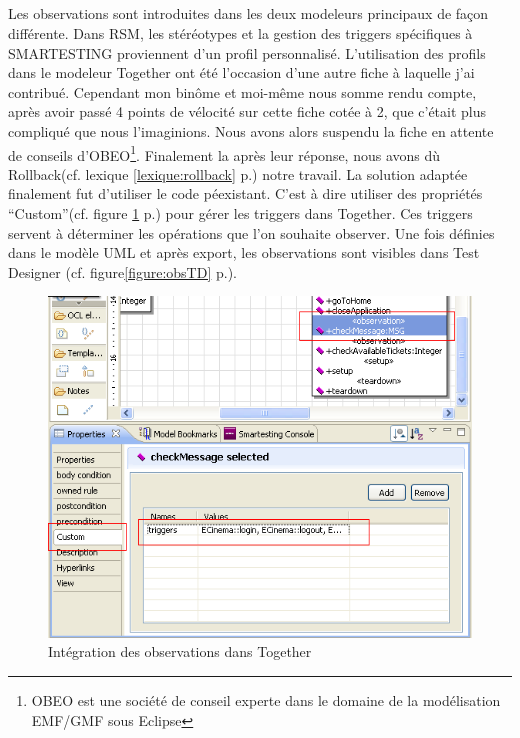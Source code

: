 \subparagraph*{}
Les observations sont introduites dans les deux modeleurs principaux de façon différente. Dans RSM, les stéréotypes et la gestion des triggers spécifiques à SMARTESTING proviennent d'un profil personnalisé. L'utilisation des profils dans le modeleur Together ont été l'occasion d'une autre fiche à laquelle j'ai contribué. Cependant mon binôme et moi-même nous somme rendu compte, après avoir passé 4 points de vélocité sur cette fiche cotée à 2, que c'était plus compliqué que nous l'imaginions. Nous avons alors suspendu la fiche en attente de conseils d'OBEO\footnote{OBEO est une société de conseil experte dans le domaine de la modélisation EMF/GMF sous Eclipse}. Finalement la après leur réponse, nous avons dù Rollback(cf. lexique \ref{lexique:rollback} p.\pageref{lexique:rollback}) notre travail. La solution adaptée finalement fut d'utiliser le code péexistant. C'est à dire utiliser des propriétés ``Custom''(cf. figure \ref{figure:obsTriggerTG} p.\pageref{figure:obsTriggerTG}) pour gérer les triggers dans Together. Ces triggers servent à déterminer les opérations que l'on souhaite observer. Une fois définies dans le modèle UML et après export, les observations sont visibles dans Test Designer (cf. figure\ref{figure:obsTD} p.\pageref{figure:obsTD}).

\begin{figure}[!ht]
\centering
\includegraphics[scale=0.5]{Illustrations/Observation_Trigger_Together.png}
\caption{Intégration des observations dans Together}
\label{figure:obsTriggerTG}
\end{figure}

